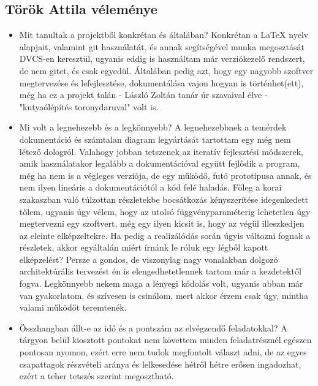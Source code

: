 \subsection{Török Attila véleménye}
\begin{itemize}

\item Mit tanultak a projektből konkrétan és általában? \newline
Konkrétan a \LaTeX{} nyelv alapjait, valamint git használatát, és annak segítségével munka megosztását DVCS-en keresztül, ugyanis eddig is használtam már verziókezelő rendszert, de nem gitet, és csak egyedül. Általában pedig azt, hogy egy nagyobb szoftver megtervezése és lefejlesztése, dokumentálása vajon hogyan is történhet(ett), még ha ez a projekt talán - László Zoltán tanár úr szavaival élve - "kutyaólépítés toronydaruval" volt is.

\item Mi volt a legnehezebb és a legkönnyebb? \newline
A legnehezebbnek a temérdek dokumentáció és számtalan diagram legyártását tartottam egy még nem létező dologról. Valahogy jobban tetszenek az iteratív fejlesztési módszerek, amik használatakor legalább a dokumentációval együtt fejlődik a program, még ha nem is a végleges verziója, de egy működő, futó prototípusa annak, és nem ilyen lineáris a dokumentációtól a kód felé haladás. Főleg a korai szakaszban való túlzottan részletekbe bocsátkozás kényszerítése idegenkedett tőlem, ugyanis úgy vélem, hogy az utolsó függvényparaméterig lehetetlen úgy megtervezni egy szoftvert, még egy ilyen kicsit is, hogy az végül illeszkedjen az eleinte elképzeltekre. Ha pedig a realizálódás során úgyis változni fognak a részletek, akkor egyáltalán miért írnánk le róluk egy légből kapott elképzelést? Persze a gondos, de viszonylag nagy vonalakban dolgozó architektúrális tervezést én is elengedhetetlennek tartom már a kezdetektől fogva.
Legkönnyebb nekem maga a lényegi kódolás volt, ugyanis abban már van gyakorlatom, és szívesen is csinálom, mert akkor érzem csak úgy, mintha valami működőt teremtenék.

\item Összhangban állt-e az idő és a pontszám az elvégzendő feladatokkal? \newline
A tárgyon belül kiosztott pontokat nem követtem minden feladatrésznél egészen pontosan nyomon, ezért erre nem tudok megfontolt választ adni, de az egyes csapattagok részvételi aránya és lelkesedése hétről hétre erősen ingadozhat, ezért a teher tetszés szerint megosztható.


\end{itemize}
